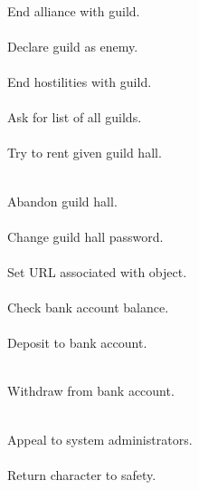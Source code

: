 \begin{protocol}
  \\
End alliance with guild. \\

  \\
Declare guild as enemy. \\

  \\
End hostilities with guild. \\

 \\
Ask for list of all guilds. \\

   \\
Try to rent given guild hall. \\

 \\
Abandon guild hall. \\

  \\
Change guild hall password. \\

   \\
Set URL associated with object. \\

 \\
Check bank account balance. \\

  \\
Deposit to bank account. \\

 \\
Withdraw from bank account. \\

  \\
Appeal to system administrators. \\

 \\
Return character to safety. \\


\end{protocol}
